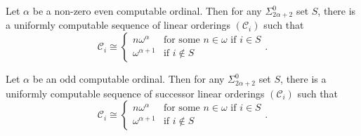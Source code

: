 \documentclass{amsart}
\newcommand\+[1]{\mathcal{#1}}
\renewcommand\*[1]{\mathbf{#1}}
\renewcommand\=[1]{\text{#1}}
\renewcommand\*[1]{\mathbf{#1}}
\newcommand{\nat}{\omega}
\begin{document}
\begin{lemma}\label{lem:ordinalshard}
  Let $\alpha$ be a non-zero even computable ordinal. Then for any $\Sigma^0_{2\alpha+2}$ set $S$, there is a uniformly computable sequence of linear orderings $(\+C_i)$ such that
  \[ \+C_i\cong\begin{cases} n \omega^\alpha & \text{for some $n\in \nat$ if $i\in S$}\\
  \omega^{\alpha+1} & \text{if } i\not\in S\end{cases}.\]
\end{lemma}
\begin{lemma}\label{lem:succordinalshard}
  Let $\alpha$ be an odd computable ordinal. Then for any $\Sigma^0_{2\alpha+2}$ set $S$, there is a uniformly computable sequence of successor linear orderings $(\+C_i)$ such that
  \[ \+C_i\cong\begin{cases} n\omega^\alpha & \text{for some $n\in \nat$ if $i\in S$}\\
  \omega^{\alpha+1}& \text{if } i\not\in S\end{cases}.\]
\end{lemma}
\end{document}
